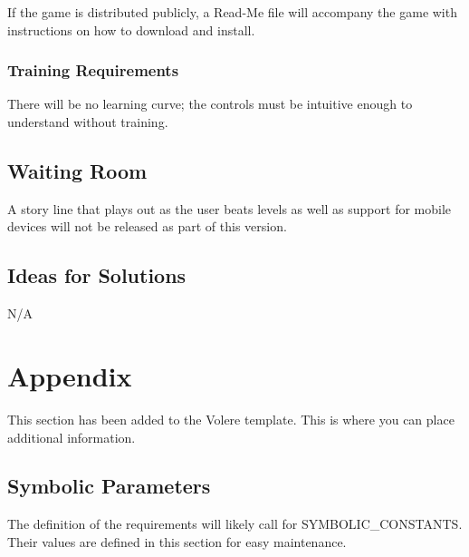 \documentclass[12pt, titlepage]{article}
\begin{document}
If the game is distributed publicly, a Read-Me file will accompany the game with instructions on how to download and install.

\subsubsection{Training Requirements}
There will be no learning curve; the controls must be intuitive enough to understand without training.

\subsection{Waiting Room}
A story line that plays out as the user beats levels as well as support for mobile devices will not be released as part of this version.

\subsection{Ideas for Solutions}
N/A





\newpage

\section{Appendix}

This section has been added to the Volere template.  This is where you can place
additional information.

\subsection{Symbolic Parameters}

The definition of the requirements will likely call for SYMBOLIC\_CONSTANTS.
Their values are defined in this section for easy maintenance.
\end{document}

